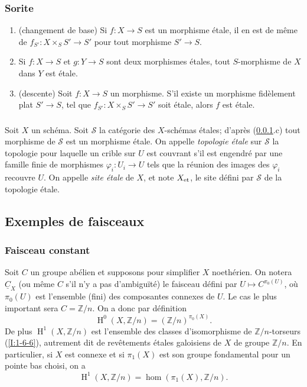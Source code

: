 \documentclass{book}
\DeclareMathOperator{\h}{H}
\newcommand{\dZ}{\mathbb{Z}}
\newcommand{\sS}{\mathscr{S}}
\newcommand{\const}[1]{\underline{#1}}
\newcommand{\et}[1]{{#1}_{\textnormal{et}}}
\begin{document}
\subsubsection{Sorite}\label{I:2-1-3}
\begin{enumerate}[\indent a)]
  \item (changement de base) Si $f:X\to S$ est un morphisme étale, il en est 
    de même de $f_{S'}:X\times_S S'\to S'$ pour tout morphisme $S'\to S$. 
  \item Si $f:X\to S$ et $g:Y\to S$ sont deux morphismes étales, tout 
    $S$-morphisme de $X$ dans $Y$ est étale.
  \item (descente) Soit $f:X\to S$ un morphisme. S'il existe un morphisme 
    fidèlement plat $S'\to S$, tel que $f_{S'}:X\times_S S'\to S'$ soit 
    étale, alors $f$ est étale.
\end{enumerate}





\subsubsection{}\label{I:2-1-4}

Soit $X$ un schéma. Soit $\sS$ la catégorie des $X$-schémas étales; 
d'après (\ref{I:2-1-3}.c) tout morphisme de $\sS$ est un morphisme étale. 
On appelle \emph{topologie étale} sur $\sS$ la topologie pour laquelle un 
crible sur $U$ est couvrant s'il est engendré par une famille finie de 
morphismes $\varphi_i:U_i\to U$ tels que la réunion des images des 
$\varphi_i$ recouvre $U$. On appelle \emph{site étale} de $X$, et note 
$\et X$, le site défini par $\sS$ de la topologie étale. 










\subsection{Exemples de faisceaux}\label{I:2-2}





\subsubsection{Faisceau constant}\label{I:2-2-1}

Soit $C$ un groupe abélien et supposons pour simplifier $X$ noethérien. On 
notera $\const C_X$ (ou même $C$ s'il n'y a pas d'ambiguïté) le faisceau 
défini par $U\mapsto C^{\pi_0(U)}$, où $\pi_0(U)$ est l'ensemble (fini) des 
composantes connexes de $U$. Le cas le plus important sera $C=\dZ/n$. On a donc 
par définition 
\[
  \h^0(X,\dZ/n)=\left(\dZ/n\right)^{\pi_0(X)}\text{.}
\]
De plus $\h^1(X,\dZ/n)$ est l'ensemble des classes d'isomorphisme de 
$\dZ/n$-torseurs (\ref{I:1-6-6}), autrement dit de revêtements étales 
galoisiens de $X$ de groupe $\dZ/n$. En particulier, si $X$ est connexe et si 
$\pi_1(X)$ est son groupe fondamental pour un pointe bas choisi, on a 
\[
  \h^1(X,\dZ/n) = \hom(\pi_1(X),\dZ/n)\text{.}
\]
\end{document}

